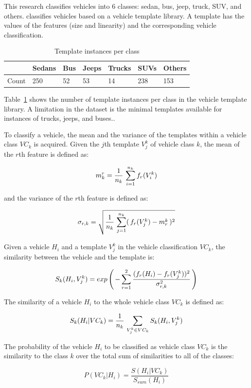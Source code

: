 \documentclass[conference]{IEEEtran}
\begin{document}
This research classifies vehicles into 6 classes: sedan, bus, jeep, truck, SUV, and others.  \cite{Jun-Wei} classifies vehicles based on a vehicle template library. A template has the values of the features (size and linearity) and the corresponding vehicle classification. 
\begin{table}[]
\centering
\caption{Template instances per class}
\label{template_instances}
\begin{tabular}{|l|l|l|l|l|l|l|}
\hline
       & Sedans & Bus & Jeeps & Trucks & SUVs & Others \\ \hline
Count  & 250    & 52  & 53    & 14     & 238  & 153    \\ \hline
\end{tabular}
\end{table}

Table~\ref{template_instances} shows the number of template instances per class in the vehicle template library. A limitation in the dataset is the minimal templates available for instances of trucks, jeeps, and buses..

To classify a vehicle, the mean and the variance of the templates within a vehicle class $VC_k$ is acquired. Given the $j$th template $V_j^k$ of vehicle class $k$, the mean of the $r$th feature is defined as:

$$
m_k^r = \frac{1}{n_k} \thinspace \sum_{i=1}^{n_k} f_r (V_i^k)
$$

and the variance of the $r$th feature is defined as:

$$
\sigma_{r,k} = \sqrt{ \frac{1}{n_k} \thinspace \sum_{j=1}^{n_k} ( \thinspace f_r (V_j^k) - m_r^k \thinspace ) ^2 }
$$

Given a vehicle $H_i$ and a template $V_j^k$ in the vehicle classification $VC_k$, the similarity between the vehicle and the template is:

$$
S_k (H_i, V_j^k) = exp \left( \thinspace - \sum_{r=1}^{2} \frac{ (f_r(H_i) - f_r(V_j^k) )^2 }{\sigma_{r, k}^2 } \thinspace \right)
$$

The similarity of a vehicle $H_i$ to the whole vehicle class $VC_k$ is defined as:

$$
S_k (H_i | VC_k) = \frac{1}{n_k} \thinspace \sum_{V_j^k \in VC_k } S_k (H_i, V_j^k)
$$

The probability of the vehicle $H_i$ to be classified as vehicle class $VC_k$ is the similarity to the class $k$ over the total sum of similarities to all of the classes:

$$
P(VC_k | H_i) = \frac{S(H_i | VC_k)}{S_{sum} (H_i)}
$$
\end{document}
